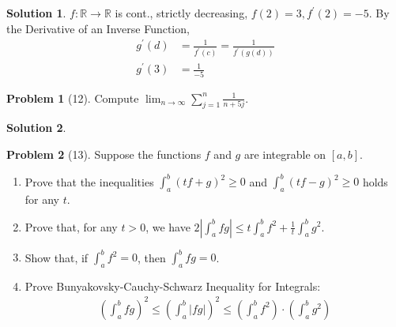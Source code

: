 \documentclass[12pt]{article}
\theoremstyle{definition} %
\newtheorem{solution}{Solution}
\newtheorem{problem}{Problem}
\theoremstyle{plain} %
\begin{document}
\begin{solution}
    $f:\mathbb{{R}}\to \mathbb{{R}}$ is cont., strictly decreasing, $f(2)=3, f^\prime (2)=-5$. By the Derivative of an Inverse Function, 
    \begin{align}
    g^\prime (d)&=\frac{1}{f^\prime (c)}= \frac{1}{f^\prime (g(d))} \label{in} \\[10pt] 
    g^\prime (3) &= \boxed{\frac{1}{-5}}
    \end{align}   
\end{solution}
\begin{problem}[12]
   Compute $\lim_{n \to \infty} \sum_{j=1}^{n} \frac{1}{n+5j}$.  
\end{problem}
\begin{solution}
    
\end{solution}
\begin{problem}[13]
   Suppose the functions $f$ and $g$ are integrable on $[a,b]$. 
   \begin{enumerate}
    \item Prove that the inequalities $\int_{a}^{b} (tf+g)^{2} \geq 0$ and $\int_{a}^{b} (tf-g)^{2} \geq 0$ holds for any $t$.
    \item Prove that, for any $t>0$, we have $2\left\vert \int_{a}^{b} fg \right\vert \leq t\int_{a}^{b} f^{2} +\frac{1}{t}\int_{a}^{b} g^{2}$. \label{bun}
    \item Show that, if $\int_{a}^{b} f^{2} = 0$, then $\int_{a}^{b} fg=0  $.     
    \item Prove Bunyakovsky-Cauchy-Schwarz Inequality for Integrals:
     \begin{align}
        \left( \int_{a}^{b} fg   \right)^{2} \leq \left( \int_{a}^{b} \left\vert fg \right\vert    \right)^{2} \leq \left( \int_{a}^{b} f^{2}   \right) \cdot \left( \int_{a}^{b} g^{2}  \right) \label{bunya}
    \end{align}
   \end{enumerate}  
\end{problem}
\end{document}
